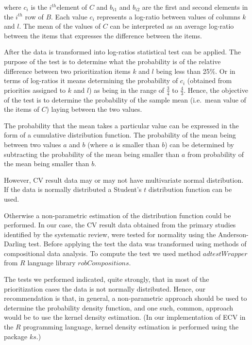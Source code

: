 where $c_{i}$ is the $i^{th}$element of $C$ and $b_{i1}$ and $b_{i2}$ are the first and second elements in the $i^{th}$ row of $B$.
Each value $c_{i}$ represents a log-ratio between values of columns $k$ and $l$.
The mean of the values of $C$ can be interpreted as an average log-ratio between the items that expresses the difference between the items.

After the data is transformed into log-ratios statistical test can be applied.
The purpose of the test is to determine what the probability is of the relative difference between two prioritization items $k$ and $l$ being less than 25\%.
Or in terms of log-ratios it means determining the probability of $c_{i}$ (obtained from priorities assigned to $k$ and $l$) as being in the range of $\frac{3}{4}$ to $\frac{4}{3}$.
Hence, the objective of the test is to determine the probability of the sample mean (i.e.\ mean value of the items of $C$) laying between the two values.

The probability that the mean takes a particular value can be expressed in the form of a cumulative distribution function.
The probability of the mean being between two values $a$ and $b$ (where $a$ is smaller than $b$) can be determined by subtracting the probability of the mean being smaller than $a$ from probability of the mean being smaller than $b$.

However, CV result data may or may not have multivariate normal distribution.
If the data is normally distributed a Student's $t$ distribution function can be used.

Otherwise a non-parametric estimation of the distribution function could be performed.
In our case, the CV result data obtained from the primary studies identified by the systematic review, were tested for normality using the Anderson-Darling test.
Before applying the test the data was transformed using methods of compositional data analysis.
To compute the test we used method $adtestWrapper$ from $R$ language library $robCompositions$.

The tests we performed indicated, quite strongly, that in most of the prioritization cases the data is not normally distributed.
Hence, our recommendation is that, in general, a non-parametric approach should be used to determine the probability density function, and one such, common, approach would be to use the kernel density estimation.
(In our implementation of ECV in the $R$ programming language, kernel density estimation is performed using the package $ks$.)

